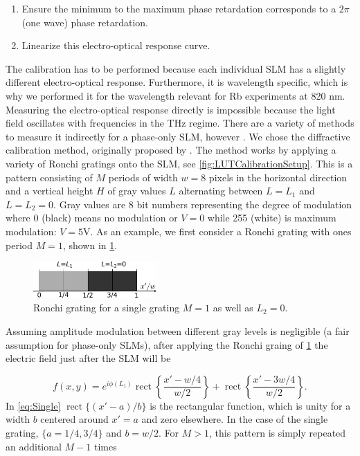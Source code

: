 \begin{enumerate}
    \itemsep=0pt
    
    \item Ensure the minimum to the maximum phase retardation corresponds to a $2\pi$ (one wave) phase retardation.
    
    \item Linearize this electro-optical response curve. 
\end{enumerate}
The calibration has to be performed because each individual SLM has a slightly different electro-optical response. 
Furthermore, it is wavelength specific, which is why we performed it for the wavelength relevant for Rb experiments at 820 nm. 
Measuring the electro-optical response directly is impossible because the light field oscillates with frequencies in the THz regime.
There are a variety of methods to measure it indirectly for a phase-only \ac{SLM}, however \cite{Li2019}.
We chose the diffractive calibration method, originally proposed by \cite{Zhang1994}.
The method works by applying a variety of Ronchi gratings onto the SLM, see \cref{fig:LUTCalibrationSetup}.
This is a pattern consisting of $M$ periods of width $w=8$ pixels in the horizontal direction and a vertical height $H$ of gray values $L$ alternating between $L=L_1$ and $L=L_2=0$.
Gray values are 8 bit numbers representing the degree of modulation where 0 (black) means no modulation or $V=0$ while 255 (white) is maximum modulation: $V=5$V. As an example, we first consider a Ronchi grating with ones period $M=1$, shown in \cref{fig:OneGrating}.

\begin{figure}[h]
    \centering
    \includegraphics[width=0.42\textwidth]{figures/OneGrating.pdf}
    \caption{Ronchi grating for a single grating $M=1$ as well as $L_2=0$.}
    \label{fig:OneGrating}
\end{figure}

\noindent Assuming amplitude modulation between different gray levels is negligible (a fair assumption for phase-only SLMs), after applying the Ronchi graing of \cref{fig:OneGrating} the electric field just after the SLM will be

\begin{equation}\label{eq:Single}
    f(x,y) = e^{i\phi(L_1)} \operatorname{rect} \left\{ 
    \frac{x'-w/4}{w/2}\right\} +
    \operatorname{rect}\left\{ \frac{x'-3w/4}{w/2}\right\}.
\end{equation}
In \cref{eq:Single} $\operatorname{rect}\{(x'-a)/b\}$ is the rectangular function, which is unity for a width $b$ centered around $x'=a$ and zero elsewhere.
In the case of the single grating, $\{a=1/4, 3/4\}$ and $b=w/2$.
For $M>1$, this pattern is simply repeated an additional $M-1$ times \cite{Zhang1994}

